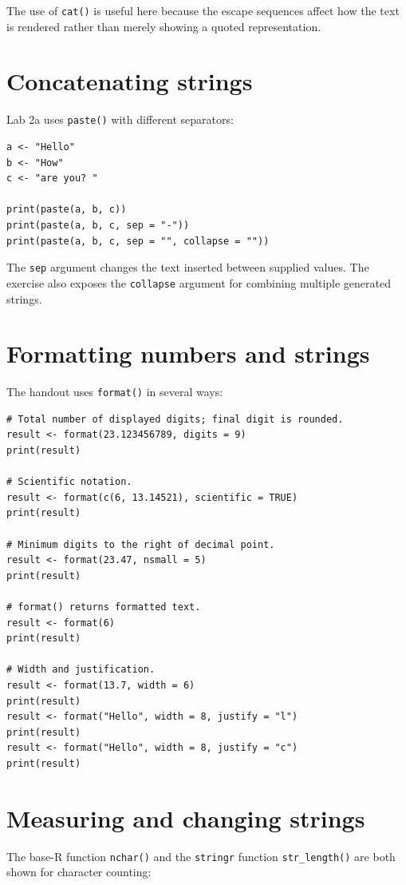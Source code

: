 The use of \texttt{cat()} is useful here because the escape sequences affect how the text is rendered rather than merely showing a quoted representation.

\section{Concatenating strings}

Lab 2a uses \texttt{paste()} with different separators:

\begin{lstlisting}[style=dsr]
a <- "Hello"
b <- "How"
c <- "are you? "

print(paste(a, b, c))
print(paste(a, b, c, sep = "-"))
print(paste(a, b, c, sep = "", collapse = ""))
\end{lstlisting}

The \texttt{sep} argument changes the text inserted between supplied values. The exercise also exposes the \texttt{collapse} argument for combining multiple generated strings.

\section{Formatting numbers and strings}

The handout uses \texttt{format()} in several ways:

\begin{lstlisting}[style=dsr]
# Total number of displayed digits; final digit is rounded.
result <- format(23.123456789, digits = 9)
print(result)

# Scientific notation.
result <- format(c(6, 13.14521), scientific = TRUE)
print(result)

# Minimum digits to the right of decimal point.
result <- format(23.47, nsmall = 5)
print(result)

# format() returns formatted text.
result <- format(6)
print(result)

# Width and justification.
result <- format(13.7, width = 6)
print(result)
result <- format("Hello", width = 8, justify = "l")
print(result)
result <- format("Hello", width = 8, justify = "c")
print(result)
\end{lstlisting}

\section{Measuring and changing strings}

The base-R function \texttt{nchar()} and the \texttt{stringr} function \texttt{str\_length()} are both shown for character counting:

